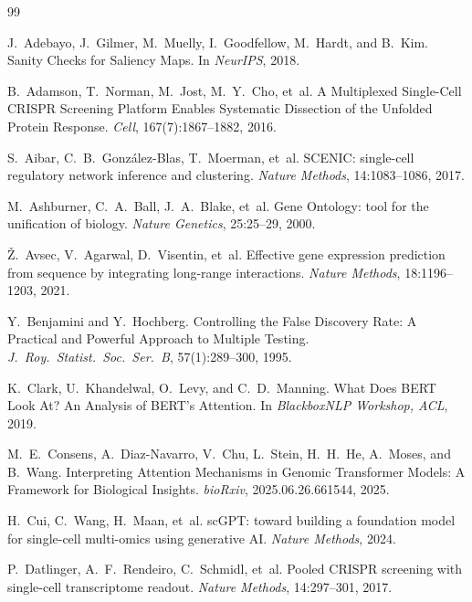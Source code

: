 \documentclass[11pt]{article}
\begin{document}
\begin{thebibliography}{99}

J.~Adebayo, J.~Gilmer, M.~Muelly, I.~Goodfellow, M.~Hardt, and B.~Kim.
\newblock Sanity Checks for Saliency Maps.
\newblock In \emph{NeurIPS}, 2018.

B.~Adamson, T.~Norman, M.~Jost, M.~Y.~Cho, et~al.
\newblock A Multiplexed Single-Cell CRISPR Screening Platform Enables Systematic Dissection of the Unfolded Protein Response.
\newblock \emph{Cell}, 167(7):1867--1882, 2016.

S.~Aibar, C.~B.~Gonz\'alez-Blas, T.~Moerman, et~al.
\newblock SCENIC: single-cell regulatory network inference and clustering.
\newblock \emph{Nature Methods}, 14:1083--1086, 2017.

M.~Ashburner, C.~A.~Ball, J.~A.~Blake, et~al.
\newblock Gene Ontology: tool for the unification of biology.
\newblock \emph{Nature Genetics}, 25:25--29, 2000.

\v{Z}.~Avsec, V.~Agarwal, D.~Visentin, et~al.
\newblock Effective gene expression prediction from sequence by integrating long-range interactions.
\newblock \emph{Nature Methods}, 18:1196--1203, 2021.

Y.~Benjamini and Y.~Hochberg.
\newblock Controlling the False Discovery Rate: A Practical and Powerful Approach to Multiple Testing.
\newblock \emph{J.~Roy.~Statist.~Soc.~Ser.~B}, 57(1):289--300, 1995.

K.~Clark, U.~Khandelwal, O.~Levy, and C.~D.~Manning.
\newblock What Does {BERT} Look At? An Analysis of {BERT}'s Attention.
\newblock In \emph{BlackboxNLP Workshop, ACL}, 2019.

M.~E.~Consens, A.~Diaz-Navarro, V.~Chu, L.~Stein, H.~H.~He, A.~Moses, and B.~Wang.
\newblock Interpreting Attention Mechanisms in Genomic Transformer Models: A Framework for Biological Insights.
\newblock \emph{bioRxiv}, 2025.06.26.661544, 2025.

H.~Cui, C.~Wang, H.~Maan, et~al.
\newblock scGPT: toward building a foundation model for single-cell multi-omics using generative AI.
\newblock \emph{Nature Methods}, 2024.

P.~Datlinger, A.~F.~Rendeiro, C.~Schmidl, et~al.
\newblock Pooled {CRISPR} screening with single-cell transcriptome readout.
\newblock \emph{Nature Methods}, 14:297--301, 2017.


\end{thebibliography}
\end{document}
